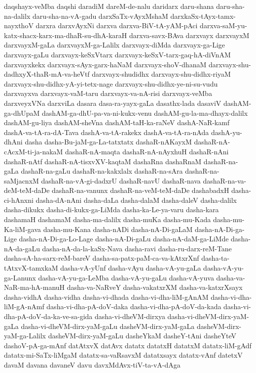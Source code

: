 {daqshayx-veMba
daqshi
daradiM
dareM-de-nalu
daridarx
daru-shana
daru-sha-na-dalilx
daru-sha-na-vA-gadu
darxSaTx-vAyxMshaM
darxkaSx-tAyx-tamx-nayxthoV
darxra
darxvAyxNi
darxva
darxva-BiV-tA-yAM-pAci
darxva-saM-yu-katx-shacx-karx-ma-dhaR-su-dhA-karaH
darxva-savx-BAva
darxvayx
darxvayxM
darxvayxM-gaLa
darxvayxM-ga-Lalilx
darxvayx-diMda
darxvayx-ga-Lige
darxvayx-gaLu
darxvayx-keSxVtarx
darxvayx-keSxV-tarx-gaq-hA-diVnAM
darxvayxkekx
darxvayx-sAyx-garx-haNaM
darxvayx-shoV-dhanaM
darxvayx-shu-dadhxyX-thaR-mA-va-heVtf
darxvayx-shudidhx
darxvayx-shu-didhx-riyaM
darxvayx-shu-didhx-yA-yi-tetx-nage
darxvayx-shu-didhx-ye-ni-su-vudu
darxvayxva
darxvayx-vaM-taru
darxvayx-va-nA-risi
darxvayx-veMba
darxveyxVNa
darxviLa
dasara
dasa-ra-yayx-gaLa
dasathx-lada
dasaviV
dashAM-ga-dhUpaM
dashAM-ga-dhU-pa-va-ni-kukx-venu
dashAM-gu-la-ma-dhayx-dalilx
dashAM-gu-liya
dashAM-sheVna
dashAM-taH-ka-raNeV
dashA-NaR-kamf
dashA-va-tA-ra-dA-Tava
dashA-va-tA-rakekx
dashA-va-tA-ra-nAda
dashA-yu-dhAni
dasha
dasha-Bu-jaM-ga-La-tatxtatx
dashaR-nAKayxM
dashaR-nA-cAcxM-ti-ja-nakaM
dashaR-nA-maqta
dashaR-nA-nAyxhuH
dashaR-nAni
dashaR-nAtf
dashaR-nA-tisxvXV-kaqtaM
dashaRna
dashaRnaM
dashaR-na-gaLa
dashaR-na-gaLu
dashaR-na-kakxlalx
dashaR-na-sAra
dashaR-na-saMjacnxM
dashaR-na-vA-gi-dadxrU
dashaR-navU
dashaR-nava
dashaR-na-va-deM-teM-daDe
dashaR-na-vanunx
dashaR-na-veM-teM-daDe
dashabadxH
dasha-ci-hAnxni
dasha-dA-nAni
dasha-daLa
dasha-dalaM
dasha-daleV
dasha-dalilx
dasha-dikukx
dasha-di-kukx-ga-LiMda
dasha-ka-Le-ya-varu
dasha-kara
dashamaH
dashamaM
dasha-ma-dalilx
dasha-muKa
dasha-mu-Kada
dasha-mu-Ka-liM-gava
dasha-mu-Kana
dasha-nADi
dasha-nA-Di-gaLaM
dasha-nA-Di-ga-Lige
dasha-nA-Di-ga-Lo-Lage
dasha-nA-Di-gaLu
dasha-nA-daM-ga-LiMde
dasha-nA-da-gaLu
dasha-nA-da-la-kaSx-Nava
dasha-ravi
dasha-ru-darx-reM-Tane
dasha-sA-ha-sarx-reM-bareV
dasha-sa-patx-paM-ca-va-kAtxrXnf
dasha-ta-tAtxvX-tamxkaM
dasha-vA-yUnf
dasha-vAyu
dasha-vA-yu-gaLa
dasha-vA-yu-ga-Lanunx
dasha-vA-yu-ga-LeMba
dasha-vA-yu-gaLu
dasha-vA-yuva
dasha-va-NaR-ma-hA-manuH
dasha-va-NaRveY
dasha-vakatxrXM
dasha-va-katxrXsayx
dasha-vidhA
dasha-vidha
dasha-vi-dhada
dasha-vi-dha-liM-gAnAM
dasha-vi-dha-liM-gA-nAmf
dasha-vi-dha-pA-doV-daka
dasha-vi-dha-pA-doV-da-kada
dasha-vi-dha-pA-doV-da-ka-ve-sa-gida
dasha-vi-dheVM-dirxya
dasha-vi-dheVM-dirx-yaM-gaLa
dasha-vi-dheVM-dirx-yaM-gaLu
dasheVM-dirx-yaM-gaLa
dasheVM-dirx-yaM-ga-Lalilx
dasheVM-dirx-yaM-gaLu
dasheYkaM
dasheY-tAni
dasheYteV
dashoV-pA-ga-mAnf
datAtxvX
datAvx
datatx
datatxH
datatxM
datatx-liM-gAdf
datatx-mi-SaTx-liMgaM
datatx-sa-vaRsavxM
datatxsayx
datatx-vAnf
datetxV
davaM
davana
davaneV
davu
davxMdAvx-tiV-ta-vA-dAga
}
